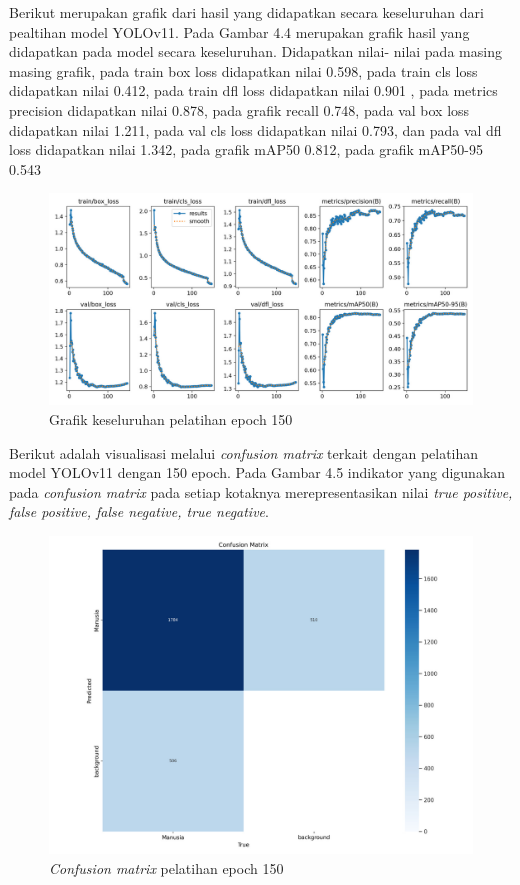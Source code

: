 Berikut merupakan grafik dari hasil yang didapatkan secara keseluruhan dari pealtihan model YOLOv11.
Pada Gambar 4.4 merupakan grafik hasil yang didapatkan pada model secara keseluruhan.
Didapatkan nilai- nilai pada masing masing grafik, pada train box loss didapatkan nilai 0.598,
pada train cls loss didapatkan nilai 0.412, pada train dfl loss didapatkan nilai 0.901 , pada
metrics precision didapatkan nilai 0.878, pada grafik recall 0.748, pada val box loss didapatkan nilai 1.211, pada val
cls loss didapatkan nilai 0.793, dan pada val dfl loss didapatkan nilai 1.342,  pada grafik mAP50
0.812, pada grafik mAP50-95 0.543

\begin{figure} [H] \centering
  \includegraphics[scale=0.23]{gambar/Hasil.jpg}
  \caption{Grafik keseluruhan pelatihan epoch 150}
  \label{fig:Pengujian Performa}
\end{figure}

Berikut adalah visualisasi melalui \emph{confusion matrix} terkait dengan pelatihan model YOLOv11 dengan 150 epoch.
Pada Gambar 4.5 indikator yang digunakan pada \emph{confusion matrix} pada setiap kotaknya merepresentasikan nilai \emph{true positive, false positive, false negative, true negative}.
\begin{figure} [H] \centering
  \includegraphics[scale=0.25]{gambar/Confusion matrix yolov11.jpg}
  \caption{\emph{Confusion matrix} pelatihan epoch 150}
  \label{fig:Pengujian Performa}
\end{figure}


